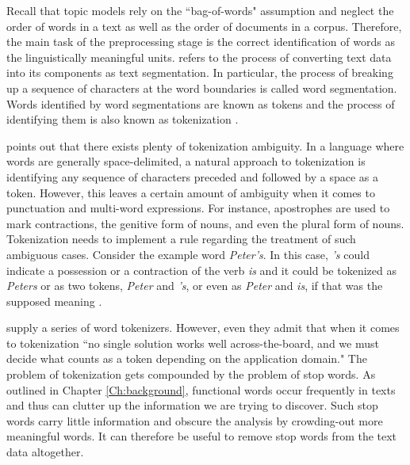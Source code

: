 \documentclass[11pt,a4paper,english,oneside]{book}
\numberwithin{equation}{chapter}
\begin{document}
Recall that topic models rely on the ``bag-of-words" assumption and neglect the order of words in a text as well as the order of documents in a corpus. Therefore, the main task of the preprocessing stage is the correct identification of words as the linguistically meaningful units. \citet[p. 10]{Palmer.2010} refers to the process of converting text data into its components as text segmentation. In particular, the process of breaking up a sequence of characters at the word boundaries is called word segmentation. Words identified by word segmentations are known as tokens and the process of identifying them is also known as tokenization \citep[p. 10]{Palmer.2010}.

\citet[pp. 16--19]{Palmer.2010} points out that there exists plenty of tokenization ambiguity. In a language where words are generally space-delimited, a natural approach to tokenization is identifying any sequence of characters preceded and followed by a space as a token. However, this leaves a certain amount of ambiguity when it comes to punctuation and multi-word expressions. For instance, apostrophes are used to mark contractions, the genitive form of nouns, and even the plural form of nouns. Tokenization needs to implement a rule regarding the treatment of such ambiguous cases. Consider the example word \textit{Peter's}. In this case, \textit{'s} could indicate a possession or a contraction of the verb \textit{is} and it could be tokenized as \textit{Peters} or as two tokens, \textit{Peter} and \textit{'s}, or even as \textit{Peter} and \textit{is}, if that was the supposed meaning \cite[pp. 16--19]{Palmer.2010}.

\cite{Bird.2010} supply a series of word tokenizers. However, even they admit that when it comes to tokenization ``no single solution works well across-the-board, and we must decide what counts as a token depending on the application domain." The problem of tokenization gets compounded by the problem of stop words. As outlined in Chapter \ref{Ch:background}, functional words occur frequently in texts and thus can clutter up the information we are trying to discover. Such stop words carry little information and obscure the analysis by crowding-out more meaningful words. It can therefore be useful to remove stop words from the text data altogether. 
\end{document}
